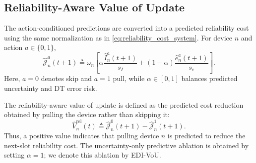 \documentclass[conference]{IEEEtran}
\begin{document}
\subsection{Reliability-Aware Value of Update}

The action-conditioned predictions are converted into a predicted
reliability cost using the same normalization as in
\eqref{eq:reliability_cost_system}. For device \(n\) and action
\(a\in\{0,1\}\),
\begin{equation}
\label{eq:predicted_reliability_cost}
\widehat{\mathcal J}_n^a(t+1)
\triangleq
\omega_n
\left[
\alpha\frac{\widehat I_n^a(t+1)}{s_I}
+
(1-\alpha)\frac{\widehat e_n^a(t+1)}{s_e}
\right].
\end{equation}
Here, \(a=0\) denotes skip and \(a=1\) pull, while
\(\alpha\in[0,1]\) balances predicted uncertainty and DT error risk.

The reliability-aware value of update is defined as the predicted
cost reduction obtained by pulling the device rather than skipping it:
\begin{equation}
\label{eq:rvou_score}
\widehat V_n^{\mathrm{rel}}(t)
\triangleq
\widehat{\mathcal J}_n^0(t+1)
-
\widehat{\mathcal J}_n^1(t+1).
\end{equation}
Thus, a positive value indicates that pulling device \(n\) is predicted
to reduce the next-slot reliability cost. The uncertainty-only predictive ablation is obtained by setting \(\alpha=1\);
we denote this ablation by EDI-VoU.
\vspace{-1.55mm}
\end{document}
